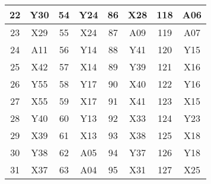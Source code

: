{\begin{tabular}{|c|c|c|c|c|c|c|c|}
  22     & Y30    & 54     & Y24    & 86     & X28    & 118    & A06    \\ \hline
  23     & X29    & 55     & X24    & 87     & A09    & 119    & A07    \\ \hline
  24     & A11    & 56     & Y14    & 88     & Y41    & 120    & Y15    \\ \hline
  25     & X42    & 57     & X14    & 89     & Y39    & 121    & X16    \\ \hline
  26     & Y55    & 58     & Y17    & 90     & X40    & 122    & Y16    \\ \hline
  27     & X55    & 59     & X17    & 91     & X41    & 123    & X15    \\ \hline
  28     & Y40    & 60     & Y13    & 92     & X33    & 124    & Y23    \\ \hline
  29     & X39    & 61     & X13    & 93     & X38    & 125    & X18    \\ \hline
  30     & Y38    & 62     & A05    & 94     & Y37    & 126    & Y18    \\ \hline
  31     & X37    & 63     & A04    & 95     & X31    & 127    & X25    \\ \hline
  
  \end{tabular}
}

